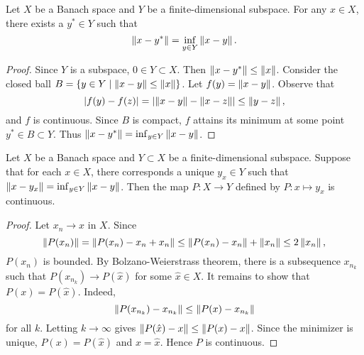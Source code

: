\begin{theorem}
    Let $X$ be a Banach space and $Y$ be a finite-dimensional subspace. For any 
    $x\in X$, there exists a $y^*\in Y$ such that 
    \begin{equation*}
        \left\lVert {x-y^*} \right\rVert = \inf_{y\in Y}\left\lVert {x-y} \right\rVert.
    \end{equation*}
\end{theorem}
\begin{proof}
    Since $Y$ is a subspace, $0\in Y\subset X$. Then $\left\lVert {x-y^*} \right\rVert\leq\left\lVert {x} \right\rVert$. 
    Consider the closed ball $B = \left\{ y\in Y \;\middle\vert\; \left\lVert {x-y} \right\rVert\leq \left\lVert {x} \right\rVert \right\}$. Let 
    $f(y) = \left\lVert {x-y} \right\rVert$. Observe that 
    \begin{equation*}
        \left\lvert {f(y) - f(z)} \right\rvert = \left\lvert {\left\lVert {x-y} \right\rVert - \left\lVert {x-z} \right\rVert} \right\rvert \leq \left\lVert {y-z} \right\rVert,
    \end{equation*}
    and $f$ is continuous. Since $B$ is compact, $f$ attains its minimum at some 
    point $y^*\in B\subset Y$. Thus $\left\lVert {x-y^*} \right\rVert = \inf_{y\in Y}\left\lVert {x-y} \right\rVert$.
\end{proof}

\begin{proposition}
    Let $X$ be a Banach space and $Y\subset X$ be a finite-dimensional subspace. 
    Suppose that for each $x\in X$, there corresponds a unique $y_x\in Y$ such 
    that $\left\lVert {x-y_x} \right\rVert = \inf_{y\in Y}\left\lVert {x-y} \right\rVert$. Then the map $P:X\to Y$ defined 
    by $P: x\mapsto y_x$ is continuous.
\end{proposition}
\begin{proof}
    Let $x_n\to x$ in $X$. Since 
    \begin{equation*}
        \left\lVert {P(x_n)} \right\rVert = \left\lVert {P(x_n) - x_n + x_n} \right\rVert \leq \left\lVert {P(x_n) - x_n} \right\rVert + \left\lVert {x_n} \right\rVert
        \leq 2\left\lVert {x_n} \right\rVert,
    \end{equation*}
    $P(x_n)$ is bounded. By Bolzano-Weierstrass theorem, there is a subsequence 
    $x_{n_k}$ such that $P(x_{n_k})\to P(\hat{x})$ for some $\hat{x}\in X$. It 
    remains to show that $P(x) = P(\hat{x})$. Indeed, 
    \begin{equation*}
        \left\lVert {P(x_{n_k}) - x_{n_k}} \right\rVert \leq \left\lVert {P(x) - x_{n_k}} \right\rVert 
    \end{equation*}
    for all $k$. Letting $k\to\infty$ gives $\left\lVert {P(\hat{x}) - x} \right\rVert \leq \left\lVert {P(x) - x} \right\rVert$. 
    Since the minimizer is unique, $P(x) = P(\hat{x})$ and $x = \hat{x}$. Hence 
    $P$ is continuous.
\end{proof}

